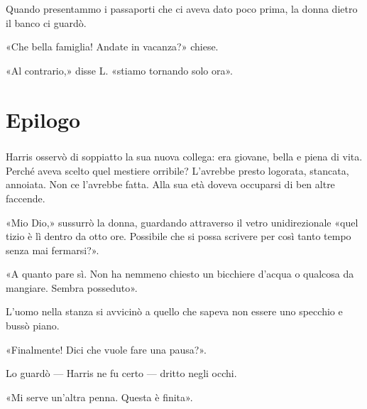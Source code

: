 \documentclass[a4paper,12pt]{book}
\begin{document}
Quando presentammo i passaporti che ci aveva dato poco prima, la donna dietro
il banco ci guardò.

«Che bella famiglia! Andate in vacanza?» chiese.

«Al contrario,» disse L. «stiamo tornando solo ora».

\backmatter

\chapter{Epilogo}

\paragraph{}
Harris osservò di soppiatto la sua nuova collega: era giovane, bella e piena
di vita. Perché aveva scelto quel mestiere orribile? L'avrebbe presto logorata,
stancata, annoiata. Non ce l'avrebbe fatta. Alla sua età doveva occuparsi di ben
altre faccende.

«Mio Dio,» sussurrò la donna, guardando attraverso il vetro unidirezionale «quel
tizio è lì dentro da otto ore. Possibile che si possa scrivere per così tanto
tempo senza mai fermarsi?».

«A quanto pare sì. Non ha nemmeno chiesto un bicchiere d'acqua o qualcosa da
mangiare. Sembra posseduto».

L'uomo nella stanza si avvicinò a quello che sapeva non essere uno specchio e
bussò piano.

«Finalmente! Dici che vuole fare una pausa?».

Lo guardò --- Harris ne fu certo --- dritto negli occhi.

«Mi serve un'altra penna. Questa è finita».

\tableofcontents
\end{document}
